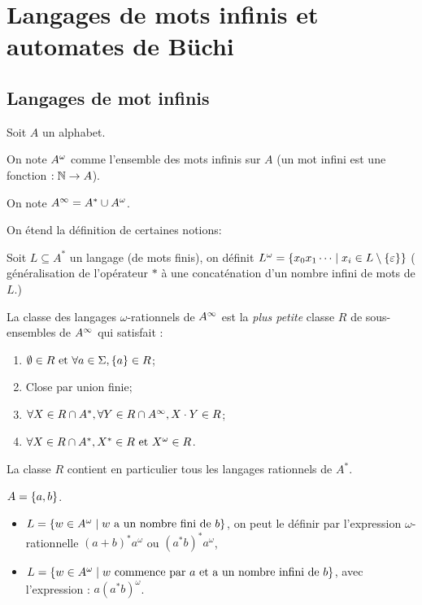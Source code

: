 \section{Langages de mots infinis et automates de Büchi}

\subsection{Langages de mot infinis}

\begin{notation}
	Soit $A$ un alphabet.

	On note $A^{\omega}$ comme l'ensemble des mots infinis sur $A$
	(un mot infini est une fonction $: \mathbb{N} \to A$).

	On note $A^{\infty} = A^* \cup A^{\omega}$.

	On étend la définition de certaines notions:

	Soit $L \subseteq A^*$ un langage (de mots finis), on définit
	$L^{\omega} = \left\{x_0x_1\cdots \mid x_i \in L \setminus \left\{\varepsilon\right\}\right\}$
	( généralisation de l'opérateur $*$ à une concaténation d'un nombre infini de mots de $L$.)
\end{notation}


\begin{definition}
	La classe des langages $\omega$-rationnels de $A^{\infty}$ est la \emph{plus petite}
	classe $R$ de sous-ensembles de $A^{\infty}$ qui satisfait :
	\begin{enumerate}
		\item $\emptyset \in R \text{ et } \forall a \in \Sigma, \left\{a\right\} \in R$;
		\item Close par union finie;
		\item $\forall X \in R \cap A^*, \forall Y \in R \cap A^{\infty}, X \cdot Y \in R$; \label{omega-clot-fi}
		\item $\forall X \in R \cap A^*, X^* \in R \text{ et } X^{\omega} \in R$.\label{omega-clot-op}
	\end{enumerate}
\end{definition}

\begin{remarque}
	La classe $R$ contient en particulier tous les langages rationnels de $A^*$.
\end{remarque}

\begin{exemple}
	$A = \left\{a,b\right\}$.

	\begin{itemize}
		\item $L = \left\{w \in A^{\omega} \mid w \text{ a un nombre fini de } b\right\}$, on peut le définir par l'expression
		      $\omega$-rationnelle $(a + b)^* a^{\omega}$ ou $(a^*b)^* a^{\omega}$,
		\item $L = \left\{w \in A^{\omega} \mid w \text{ commence par } a \text{ et } \text{a un nombre infini de } b\right\}$,
		      avec l'expression : $a(a^*b)^{\omega}$.
	\end{itemize}

\end{exemple}


